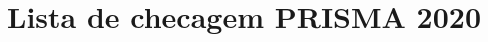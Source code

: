 \documentclass[12pt]{article}
\begin{document}
\maketitle


\nocite{*}



\appendix
\clearpage                  %
\raggedbottom               %
\section{Lista de checagem PRISMA 2020}\label{apendice:prisma}

\end{document}

